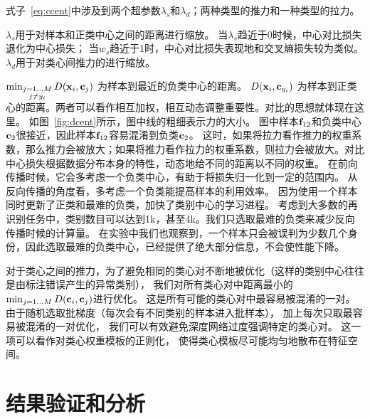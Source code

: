 式子~\ref{eq:ccent}中涉及到两个超参数$\lambda_s$和$\lambda_d$；两种类型的推力和一种类型的拉力。

$\lambda_s$用于对样本和正类中心之间的距离进行缩放。
当$\lambda_s$趋近于0时候，中心对比损失退化为中心损失；
当$w_s$趋近于1时，中心对比损失表现地和交叉熵损失较为类似。
$\lambda_d$用于对类心间推力的进行缩放。

$\min_{\substack{
			j=1...M \\
			j \neq y_i }} D(
	{\mathbf{x}}_{i}, {\mathbf{c}}_{j}
	)$
为样本到最近的负类中心的距离。
$D(
	{\mathbf{x}}_{i}, {\mathbf{c}}_{y_i}
	)$
为样本到正类心的距离。两者可以看作相互加权，相互动态调整重要性。对比的思想就体现在这里。
如图~\ref{fig:dcent}所示，图中线的粗细表示力的大小。
图中样本${\mathbf{f}}_{12}$和负类中心${\mathbf{c}}_2$很接近，因此样本${\mathbf{f}}_{12}$容易混淆到负类${\mathbf{c}}_2$。
这时，如果将拉力看作推力的权重系数，那么推力会被放大；如果将推力看作拉力的权重系数，则拉力会被放大。对比中心损失根据数据分布本身的特性，动态地给不同的距离以不同的权重。
在前向传播时候，它会多考虑一个负类中心，有助于将损失归一化到一定的范围内。
从反向传播的角度看，多考虑一个负类能提高样本的利用效率。
因为使用一个样本同时更新了正类和最难的负类，加快了类别中心的学习进程。
考虑到大多数的再识别任务中，类别数目可以达到1k，甚至4k。我们只选取最难的负类来减少反向传播时候的计算量。
在实验中我们也观察到，一个样本只会被误判为少数几个身份，因此选取最难的负类中心，已经提供了绝大部分信息，不会使性能下降。

对于类心之间的推力，为了避免相同的类心对不断地被优化（这样的类别中心往往是由标注错误产生的异常类别），
我们对所有类心对中距离最小的$\min_{j=1...M} D({\mathbf{c}}_i,{\mathbf{c}}_j)$进行优化。
这是所有可能的类心对中最容易被混淆的一对。
由于随机选取批梯度（每次会有不同类别的样本进入批样本），
加上每次只取最容易被混淆的一对优化，
我们可以有效避免深度网络过度强调特定的类心对。
这一项可以看作对类心权重模板的正则化，
使得类心模板尽可能均匀地散布在特征空间。


\section{结果验证和分析}

